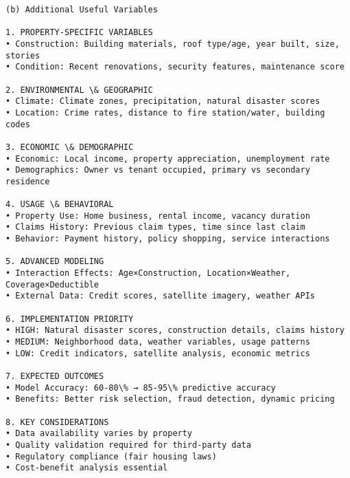 \documentclass[8pt, twocolumn]{extarticle}
\begin{document}
    \begin{Verbatim}[commandchars=\\\{\}]
(b) Additional Useful Variables

1. PROPERTY-SPECIFIC VARIABLES
• Construction: Building materials, roof type/age, year built, size, stories
• Condition: Recent renovations, security features, maintenance score

2. ENVIRONMENTAL \& GEOGRAPHIC
• Climate: Climate zones, precipitation, natural disaster scores
• Location: Crime rates, distance to fire station/water, building codes

3. ECONOMIC \& DEMOGRAPHIC
• Economic: Local income, property appreciation, unemployment rate
• Demographics: Owner vs tenant occupied, primary vs secondary residence

4. USAGE \& BEHAVIORAL
• Property Use: Home business, rental income, vacancy duration
• Claims History: Previous claim types, time since last claim
• Behavior: Payment history, policy shopping, service interactions

5. ADVANCED MODELING
• Interaction Effects: Age×Construction, Location×Weather, Coverage×Deductible
• External Data: Credit scores, satellite imagery, weather APIs

6. IMPLEMENTATION PRIORITY
• HIGH: Natural disaster scores, construction details, claims history
• MEDIUM: Neighborhood data, weather variables, usage patterns
• LOW: Credit indicators, satellite analysis, economic metrics

7. EXPECTED OUTCOMES
• Model Accuracy: 60-80\% → 85-95\% predictive accuracy
• Benefits: Better risk selection, fraud detection, dynamic pricing

8. KEY CONSIDERATIONS
• Data availability varies by property
• Quality validation required for third-party data
• Regulatory compliance (fair housing laws)
• Cost-benefit analysis essential
    \end{Verbatim}


    
    
    
\end{document}
